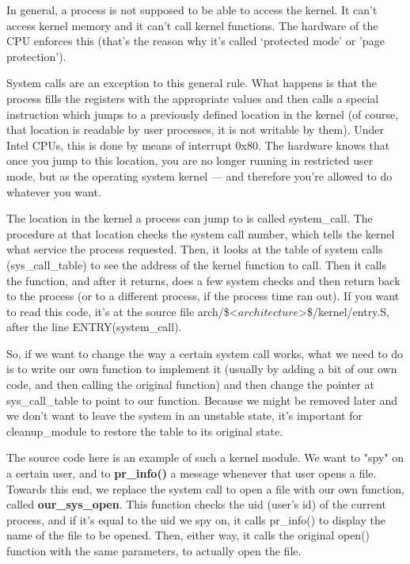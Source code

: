 \documentclass[11pt]{article}
\begin{document}
In general, a process is not supposed to be able to access the kernel. It can't access kernel memory and it can't call kernel functions. The hardware of the CPU enforces this (that's the reason why it's called `protected mode' or 'page protection').

System calls are an exception to this general rule. What happens is that the process fills the registers with the appropriate values and then calls a special instruction which jumps to a previously defined location in the kernel (of course, that location is readable by user processes, it is not writable by them). Under Intel CPUs, this is done by means of interrupt 0x80. The hardware knows that once you jump to this location, you are no longer running in restricted user mode, but as the operating system kernel --- and therefore you're allowed to do whatever you want.

The location in the kernel a process can jump to is called system\_call. The procedure at that location checks the system call number, which tells the kernel what service the process requested. Then, it looks at the table of system calls (sys\_call\_table) to see the address of the kernel function to call. Then it calls the function, and after it returns, does a few system checks and then return back to the process (or to a different process, if the process time ran out). If you want to read this code, it's at the source file arch/\$<\(architecture\)>\$/kernel/entry.S, after the line ENTRY(system\_call).

So, if we want to change the way a certain system call works, what we need to do is to write our own function to implement it (usually by adding a bit of our own code, and then calling the original function) and then change the pointer at sys\_call\_table to point to our function. Because we might be removed later and we don't want to leave the system in an unstable state, it's important for cleanup\_module to restore the table to its original state.

The source code here is an example of such a kernel module. We want to "spy" on a certain user, and to \textbf{pr\_info()} a message whenever that user opens a file. Towards this end, we replace the system call to open a file with our own function, called \textbf{our\_sys\_open}. This function checks the uid (user's id) of the current process, and if it's equal to the uid we spy on, it calls pr\_info() to display the name of the file to be opened. Then, either way, it calls the original open() function with the same parameters, to actually open the file.
\end{document}
